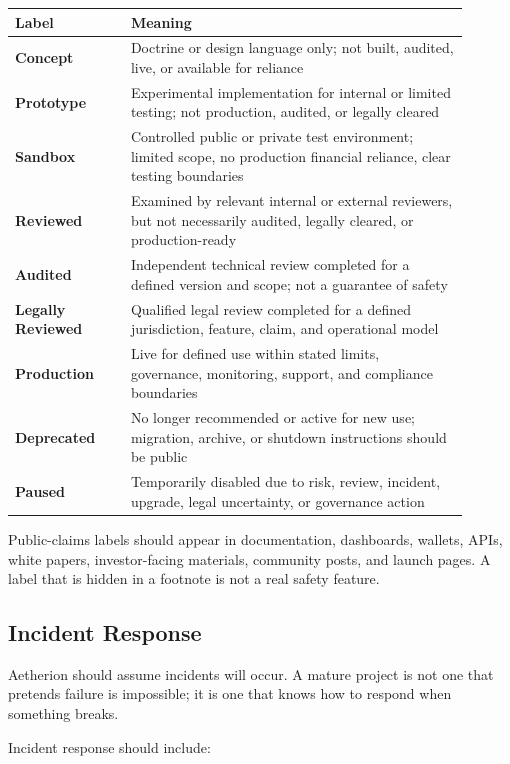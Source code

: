\documentclass[12pt]{article}
\begin{document}
\begin{longtable}{>{\bfseries}p{0.23\linewidth}p{0.67\linewidth}}
\toprule
Label & Meaning \\
\midrule
Concept & Doctrine or design language only; not built, audited, live, or available for reliance \\
Prototype & Experimental implementation for internal or limited testing; not production, audited, or legally cleared \\
Sandbox & Controlled public or private test environment; limited scope, no production financial reliance, clear testing boundaries \\
Reviewed & Examined by relevant internal or external reviewers, but not necessarily audited, legally cleared, or production-ready \\
Audited & Independent technical review completed for a defined version and scope; not a guarantee of safety \\
Legally Reviewed & Qualified legal review completed for a defined jurisdiction, feature, claim, and operational model \\
Production & Live for defined use within stated limits, governance, monitoring, support, and compliance boundaries \\
Deprecated & No longer recommended or active for new use; migration, archive, or shutdown instructions should be public \\
Paused & Temporarily disabled due to risk, review, incident, upgrade, legal uncertainty, or governance action \\
\bottomrule
\end{longtable}

Public-claims labels should appear in documentation, dashboards, wallets, APIs, white papers, investor-facing materials, community posts, and launch pages. A label that is hidden in a footnote is not a real safety feature.

\subsection{Incident Response}

Aetherion should assume incidents will occur. A mature project is not one that pretends failure is impossible; it is one that knows how to respond when something breaks.

Incident response should include:
\end{document}
